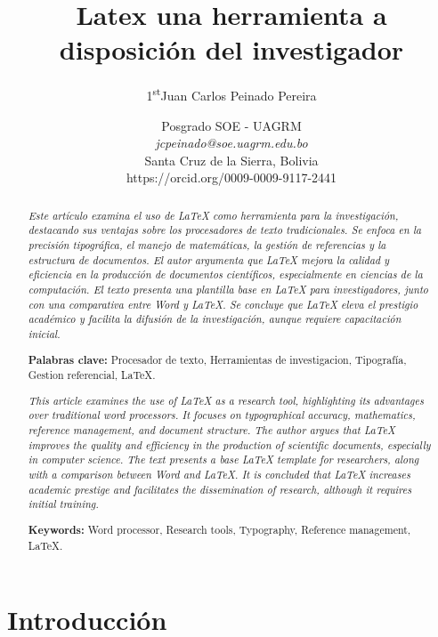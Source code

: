 \documentclass[10pt]{article}
\title{\Huge Latex una herramienta a disposición del investigador\\}
\author{\Large {1\textsuperscript{st}Juan Carlos Peinado Pereira}}
\date{\normalsize Posgrado SOE - UAGRM\\
\textit{jcpeinado@soe.uagrm.edu.bo}\\
Santa Cruz de la Sierra, Bolivia \\
https://orcid.org/0009-0009-9117-2441}
\begin{document}
\maketitle

\begin{abstract}
    \textit{\normalsize Este artículo examina el uso de LaTeX como herramienta para la investigación, destacando sus ventajas sobre los procesadores de texto tradicionales. 
    Se enfoca en la precisión tipográfica, el manejo de matemáticas, la gestión de referencias y la estructura de documentos. 
    El autor argumenta que LaTeX mejora la calidad y eficiencia en la producción de documentos científicos, especialmente en ciencias de la computación. El texto presenta una plantilla base en LaTeX para investigadores, junto con una comparativa entre Word y LaTeX.
    Se concluye que LaTeX eleva el prestigio académico y facilita la difusión de la investigación, aunque requiere capacitación inicial.} 
    \vspace{0.5cm}

    \textbf{Palabras clave:} Procesador de texto, Herramientas de investigacion, Tipografía, Gestion referencial, LaTeX.
\end{abstract}


\begin{abstract}
    \textit{\normalsize This article examines the use of LaTeX as a research tool, highlighting its advantages over traditional word processors. 
    It focuses on typographical accuracy, mathematics, reference management, and document structure. 
    The author argues that LaTeX improves the quality and efficiency in the production of scientific documents, especially in computer science. 
    The text presents a base LaTeX template for researchers, along with a comparison between Word and LaTeX. 
    It is concluded that LaTeX increases academic prestige and facilitates the dissemination of research, although it requires initial training.}    
    \vspace{0.5cm}

    \textbf{Keywords:} Word processor, Research tools, Typography, Reference management, LaTeX.
\end{abstract}


    \section{Introducción}
\end{document}
